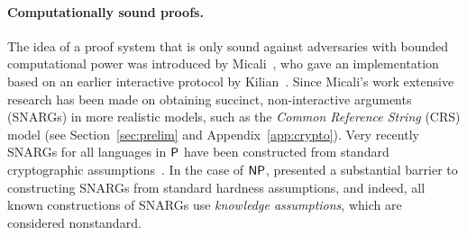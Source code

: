 \paragraph{Computationally sound proofs.}
The idea of a proof system that is only sound against adversaries with bounded computational power
was introduced by Micali~\cite{micali2000computationally},
who gave an implementation 
based on an earlier interactive protocol by Kilian~\cite{kilian1992note}.
Since Micali's work extensive research has been made on obtaining succinct, non-interactive arguments (SNARGs) in more realistic models, such as the \emph{Common Reference String} (CRS) model (see Section~\ref{sec:prelim} and Appendix~\ref{app:crypto}).
Very recently SNARGs for all languages in ${\mathsf{P}}$ have been constructed from standard cryptographic assumptions~\cite{kalai2019delegate, jawale2021snargs, choudhuri2021snargs, cryptoeprint:2022/1320}. In the case of ${\mathsf{NP}}$, \cite{gentry2011separating} presented a substantial barrier to constructing SNARGs from standard hardness assumptions, and indeed, all known constructions of SNARGs use \emph{knowledge assumptions}, which are considered nonstandard.

